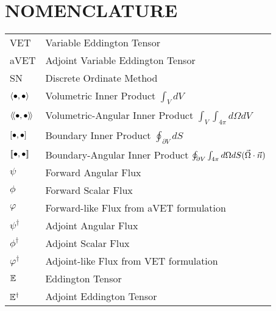 
\chapter*{NOMENCLATURE}


\hspace*{-1.25in}
\vspace{12pt}
\begin{spacing}{1.0}
	\begin{longtable}[htbp]{@{}p{} p{}@{}}
		VET 		& Variable Eddington Tensor 		\\	[2ex]
		aVET 		& Adjoint Variable Eddington Tensor	\\	[2ex]
		SN 			& Discrete Ordinate Method\\	[2ex]
		$\left\langle \bullet , \bullet \right\rangle$ 				& Volumetric Inner Product $\int_V dV$ \\	[2ex]
		$\left\langle \! \left\langle \bullet , \bullet \right\rangle \! \right\rangle$ 			& Volumetric-Angular Inner Product $\int_V \int_{4 \pi} d\Omega dV$ \\	[2ex]
		$\left[ \bullet , \bullet \right]$ 			& Boundary Inner Product $\oint_{\partial V} dS$ \\	[2ex]
		$\left[ \! \left[ \bullet , \bullet \right] \! \right]$ 		& Boundary-Angular Inner Product $\oint_{\partial V} \int_{4 \pi} d\Omega dS (\vec{\Omega} \cdot \vec{n})$ \\	[2ex]
		$\psi$ 			& Forward Angular Flux		\\	[2ex]
		$\phi$ 			& Forward Scalar Flux		\\	[2ex]
		$\varphi$ 		& Forward-like Flux from aVET formulation\\	[2ex]
		$\psi^\dag$ 	& Adjoint Angular Flux		\\	[2ex]
		$\phi^\dag$ 	& Adjoint Scalar Flux		\\	[2ex]
		$\varphi^\dag$ 	& Adjoint-like Flux from VET formulation\\	[2ex]
		$\mathbb{E}$ 			& Eddington Tensor\\	[2ex]
		$\mathbb{E}^\dag$ 	& Adjoint Eddington Tensor\\	[2ex]
	\end{longtable}
\end{spacing}

\pagebreak{}
